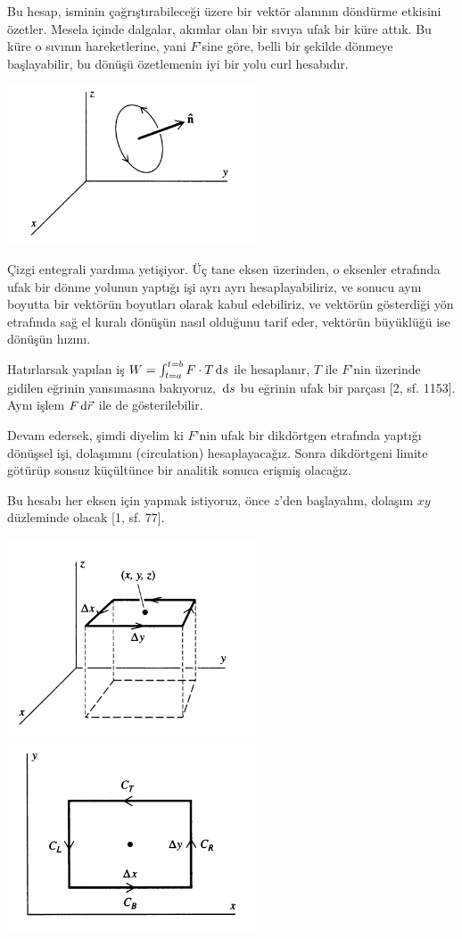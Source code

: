 \documentclass[12pt,fleqn]{article}\usepackage{../../common}
\begin{document}
Bu hesap, isminin çağrıştırabileceği üzere bir vektör alanının döndürme etkisini
özetler. Mesela içinde dalgalar, akımlar olan bir sıvıya ufak bir küre attık. Bu
küre o sıvının hareketlerine, yani $F$'sine göre, belli bir şekilde dönmeye
başlayabilir, bu dönüşü özetlemenin iyi bir yolu curl hesabıdır.

\includegraphics[width=20em]{calc_multi_70_div_curl_lap_06.png}

Çizgi entegrali yardıma yetişiyor. Üç tane eksen üzerinden, o eksenler etrafında
ufak bir dönme yolunun yaptığı işi ayrı ayrı hesaplayabiliriz, ve sonucu aynı
boyutta bir vektörün boyutları olarak kabul edebiliriz, ve vektörün gösterdiği
yön etrafında sağ el kuralı dönüşün nasıl olduğunu tarif eder, vektörün
büyüklüğü ise dönüşün hızını. 

Hatırlarsak yapılan iş $W = \int_{t=a}^{t=b} F \cdot T \,\mathrm{d} s$ ile hesaplanır,
$T$ ile $F$'nin üzerinde gidilen eğrinin yansımasına bakıyoruz, $\,\mathrm{d} s$ bu
eğrinin ufak bir parçası [2, sf. 1153]. Aynı işlem $F \,\mathrm{d} \vec{r}$ ile de
gösterilebilir.

Devam edersek, şimdi diyelim ki $F$'nin ufak bir dikdörtgen etrafında yaptığı
dönüşsel işi, dolaşımını (circulation) hesaplayacağız. Sonra dikdörtgeni limite
götürüp sonsuz küçültünce bir analitik sonuca erişmiş olacağız.

Bu hesabı her eksen için yapmak istiyoruz, önce $z$'den başlayalım, dolaşım $xy$
düzleminde olacak [1, sf. 77].

\includegraphics[width=20em]{calc_multi_70_div_curl_lap_07.png}
\includegraphics[width=20em]{calc_multi_70_div_curl_lap_08.png}
\end{document}
